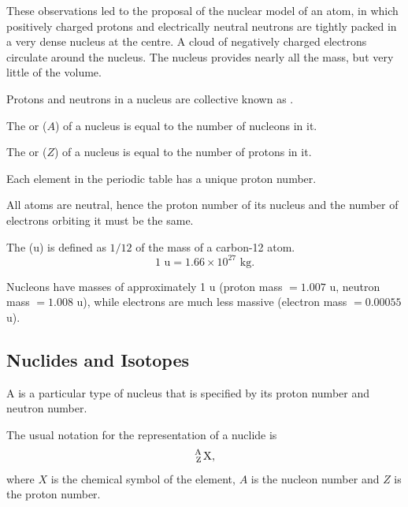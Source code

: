 These observations led to the proposal of the nuclear model of an atom, in which positively charged protons and electrically neutral neutrons are tightly packed in a very dense nucleus at the centre. A cloud of negatively charged electrons circulate around the nucleus. The nucleus provides nearly all the mass, but very little of the volume.

\begin{definition}
    Protons and neutrons in a nucleus are collective known as .
\end{definition}

\begin{definition}
    The  or  ($A$) of a nucleus is equal to the number of nucleons in it.
\end{definition}

\begin{definition}
    The  or  ($Z$) of a nucleus is equal to the number of protons in it.
\end{definition}

Each element in the periodic table has a unique proton number.

All atoms are neutral, hence the proton number of its nucleus and the number of electrons orbiting it must be the same.

\begin{definition}
    The  (u) is defined as $1/12$ of the mass of a carbon-12 atom. \[1 \text{ u} = 1.66 \times 10^{27} \text{ kg}.\]
\end{definition}

Nucleons have masses of approximately 1 u (proton mass $= 1.007$ u, neutron mass $= 1.008$ u), while electrons are much less massive (electron mass $ = 0.00055$ u).

\subsection{Nuclides and Isotopes}

\begin{definition}
    A  is a particular type of nucleus that is specified by its proton number and neutron number.
\end{definition}

The usual notation for the representation of a nuclide is \[\ce{^A_Z X},\] where $X$ is the chemical symbol of the element, $A$ is the nucleon number and $Z$ is the proton number.

